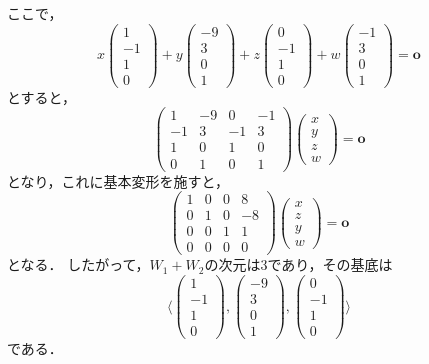 \documentclass[a4paper,10pt,fleqn]{ltjsarticle}
\begin{document}
\begin{tleftbar}
  ここで，
  \[
    x \begin{pmatrix} 1 \\ -1 \\ 1 \\ 0 \end{pmatrix} + y \begin{pmatrix} -9 \\ 3 \\ 0 \\ 1 \end{pmatrix} + z \begin{pmatrix} 0 \\ -1 \\ 1 \\ 0 \end{pmatrix} + w \begin{pmatrix} -1 \\ 3 \\ 0 \\ 1 \end{pmatrix} =\bm{o}
  \]
  とすると，
  \[
    \begin{pmatrix} 1 & -9 & 0 & -1 \\ -1 & 3 & -1 & 3 \\ 1 & 0 & 1 & 0 \\ 0 & 1 & 0 & 1 \end{pmatrix} \begin{pmatrix} x \\ y \\ z \\ w \end{pmatrix} = \bm{o}
  \]
  となり，これに基本変形を施すと，
  \[
    \begin{pmatrix} 1 & 0 & 0 & 8 \\ 0 & 1 & 0 & -8 \\0 & 0 & 1 & 1 \\ 0 & 0 & 0 & 0 \end{pmatrix} \begin{pmatrix} x \\ z \\ y \\ w \end{pmatrix} = \bm{o}
  \]
  となる．
  したがって，$W_1 + W_2$の次元は$3$であり，その基底は
  \[
    \langle \begin{pmatrix} 1 \\ -1 \\ 1 \\ 0 \end{pmatrix} , \begin{pmatrix} -9 \\ 3 \\ 0 \\ 1 \end{pmatrix} , \begin{pmatrix} 0 \\ -1 \\ 1 \\ 0 \end{pmatrix} \rangle
  \]
  である．
\end{tleftbar}
\end{document}
